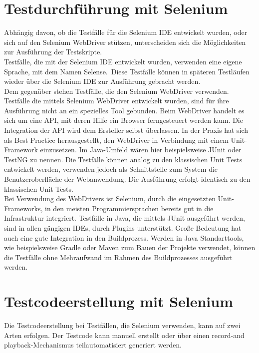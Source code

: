 \section{Testdurchführung mit Selenium}
\label{sec:testdurchführung_mit_selenium}
Abhängig davon, ob die Testfälle für die Selenium IDE entwickelt wurden, oder sich auf den Selenium WebDriver stützen, unterscheiden sich die Möglichkeiten zur Ausführung der Testskripte.\\
Testfälle, die mit der Selenium IDE entwickelt wurden, verwenden eine eigene Sprache, mit dem Namen \grq Selense\grq.\ Diese Testfälle können in späteren Testläufen wieder über die Selenium IDE zur Ausführung gebracht werden. \\
Dem gegenüber stehen Testfälle, die den Selenium WebDriver verwenden.
Testfälle die mittels Selenium WebDriver entwickelt wurden, sind für ihre Ausführung nicht an ein spezielles Tool gebunden. Beim WebDriver handelt es sich um eine API, mit deren Hilfe ein Browser ferngesteuert werden kann. Die Integration der API wird dem Ersteller selbst überlassen. In der Praxis hat sich als Best Practice herausgestellt, den WebDriver in Verbindung mit einem Unit-Framework einzusetzen.
Im Java-Umfeld wären hier beispielsweise JUnit oder TestNG zu nennen.
Die Testfälle können analog zu den klassischen Unit Tests entwickelt werden, verwenden jedoch als Schnittstelle zum System die Benutzeroberfläche der Webanwendung. 
Die Ausführung erfolgt identisch zu den klassischen Unit Tests.\\
Bei Verwendung des WebDrivers ist Selenium, durch die eingesetzten Unit-Frameworks, in den meisten Programmiersprachen bereits gut in die Infrastruktur integriert. Testfälle in Java, die mittels JUnit ausgeführt werden, sind in allen gängigen IDEs, durch Plugins unterstützt. Große Bedeutung hat auch eine gute Integration in den Buildprozess. Werden in Java Standarttools, wie beispielsweise Gradle oder Maven zum Bauen der Projekte verwendet, können die Testfälle ohne Mehraufwand im Rahmen des Buildprozesses ausgeführt werden.



\section{Testcodeerstellung mit Selenium}
\label{sec:Testdesign}
Die Testcodeerstellung bei Testfällen, die Selenium verwenden, kann auf zwei Arten erfolgen.
Der Testcode kann manuell erstellt oder über einen \grq record-and playback\grq -Mechanismus teilautomatisiert generiert werden.

